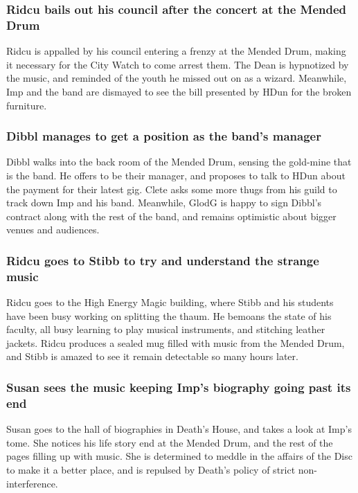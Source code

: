 \subsubsection{\Gls{Ridcu} bails out his council after the concert at the Mended Drum}
\Gls{Ridcu} is appalled by his council entering a frenzy at the Mended Drum, making it necessary
for the City Watch to come arrest them. The \Gls{Dean} is hypnotized by the music, and reminded of
the youth he missed out on as a wizard. Meanwhile, \Gls{Imp} and the band are dismayed to see the
bill presented by \Gls{HDun} for the broken furniture.

\subsubsection{\Gls{Dibbl} manages to get a position as the band's manager}
\Gls{Dibbl} walks into the back room of the Mended Drum, sensing the gold-mine that is the band. He
offers to be their manager, and proposes to talk to \Gls{HDun} about the payment for their latest
gig. \Gls{Clete} asks some more thugs from his guild to track down \Gls{Imp} and his band.
Meanwhile, \Gls{GlodG} is happy to sign \Gls{Dibbl}'s contract along with the rest of the band, and
remains optimistic about bigger venues and audiences.

\subsubsection{\Gls{Ridcu} goes to \Gls{Stibb} to try and understand the strange music}
\Gls{Ridcu} goes to the High Energy Magic building, where \Gls{Stibb} and his students have been
busy working on splitting the thaum. He bemoans the state of his faculty, all busy learning to
play musical instruments, and stitching leather jackets. \Gls{Ridcu} produces a sealed mug filled
with music from the Mended Drum, and \Gls{Stibb} is amazed to see it remain detectable so many hours
later.

\subsubsection{\Gls{Susan} sees the music keeping \Gls{Imp}'s biography going past its end}
\Gls{Susan} goes to the hall of biographies in \Gls{Death}'s House, and takes a look at \Gls{Imp}'s
tome. She notices his life story end at the Mended Drum, and the rest of the pages filling up with
music. She is determined to meddle in the affairs of the Disc to make it a better place, and
is repulsed by \Gls{Death}'s policy of strict non-interference.

